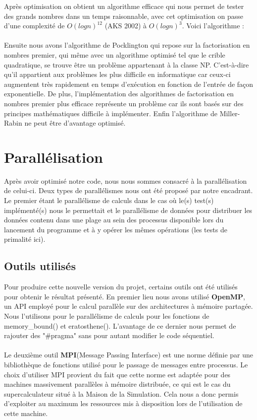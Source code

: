 Après optimisation on obtient un algorithme efficace qui nous permet de tester des grands nombres dans un temps raisonnable, avec cet optimisation on passe d'une complexité de $O (log n)^{12}$ (AKS 2002) à $O (log n)^3$. Voici l'algorithme :

	\paragraph{}Ensuite nous avons l'algorithme de Pocklington qui repose sur la factorisation en nombres premier, qui même avec un algorithme optimisé tel que le crible quadratique, se trouve être un problème appartenant à la classe NP. C'est-à-dire qu'il appartient aux problèmes les plus difficile en informatique car ceux-ci augmentent très rapidement en temps d'exécution en fonction de l'entrée de façon exponentielle. De plus, l'implémentation des algorithmes de factorisation en nombres premier plus efficace représente un problème car ils sont basés sur des principes mathématiques difficile à implémenter. Enfin l'algorithme de Miller-Rabin ne peut être d'avantage optimisé.
	

	\section{Parallélisation}
	Après avoir optimisé notre code, nous nous sommes consacré à la parallélisation de celui-ci. Deux types de parallélismes nous ont été proposé par notre encadrant. Le premier étant le parallélisme de calculs dans le cas où le(s) test(s) implémenté(s) nous le permettait et le parallélisme de données pour distribuer les données contenu dans une plage au sein des processus disponible lors du lancement du programme et à y opérer les mêmes opérations (les tests de primalité ici).

		\subsection{Outils utilisés}
Pour produire cette nouvelle version du projet, certains outils ont été utilisés pour obtenir le résultat présenté. En premier lieu nous avons utilisé \textbf{OpenMP}, un API employé pour le calcul parallèle sur des architectures à mémoire partagée. Nous l'utilisons pour le parallélisme de calculs pour les fonctions de memory\_bound() et eratosthene(). L'avantage de ce dernier nous permet de rajouter des "\#pragma" sans pour autant modifier le code séquentiel.

		\paragraph{}Le deuxième outil \textbf{MPI}(Message Passing Interface) est une norme définie par une bibliothèque de fonctions utilisé pour le passage de messages entre processus. Le choix d'utiliser MPI provient du fait que cette norme est adaptée pour des machines massivement parallèles à mémoire distribuée, ce qui est le cas du supercalculateur situé à la Maison de la Simulation. Cela nous a donc permis d'exploiter au maximum les ressources mis à disposition lors de l'utilisation de cette machine. 
		
